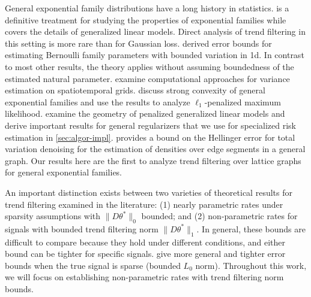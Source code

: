 \documentclass[ejs,noshowframe]{imsart}
\theoremstyle{plain}
\theoremstyle{definition}
\begin{document}
General exponential family distributions have a long history in statistics.
\citet{Brown1986} is a definitive treatment for studying the properties of
exponential families while \cite{mccullagh1989generalized} covers the details of
generalized linear models.
Direct analysis of trend filtering in this setting is more rare than for
Gaussian loss.  derived error bounds for estimating
Bernoulli family parameters with bounded variation in 1d. In contrast to most
other results, the theory applies without assuming boundedness of the estimated natural parameter.
\cite{KhodadadiMcDonald2018} examine computational approaches for variance
estimation on spatiotemporal grids. \cite{KakadeShamir2010} discuss strong
convexity of general exponential families and use the results to analyze 
$\ell_1$-penalized maximum likelihood. \cite{VaiterDeledalle2017} examine the geometry of
penalized generalized linear models and derive important results for
general regularizers that we use for specialized risk estimation in
\autoref{sec:algor-impl}. \cite{Bassett2019fused} provides a bound on the
Hellinger error for total variation denoising for the estimation of densities
over edge segments in a general graph. Our results here are the first to analyze
trend filtering over lattice graphs for general exponential families.

An important distinction exists between two varieties of theoretical results for
trend filtering examined in the literature: (1) nearly parametric rates under
sparsity assumptions with $\| D \theta^*\|_0$ bounded; and (2) non-parametric
rates for signals with bounded trend filtering norm $\| D \theta^*\|_1$. In
general, these bounds are difficult to compare because they hold under different
conditions, and either bound can be tighter for specific signals.
\cite{rinaldo2009properties,harchaoui2010multiple,lin2017sharp,
  guntuboyina2017adaptive,ortelli2019prediction} give more general and tighter
error bounds when the true signal is sparse (bounded $L_0$ norm).
Throughout this work, we will focus on establishing non-parametric rates 
with trend filtering norm bounds.
\end{document}
